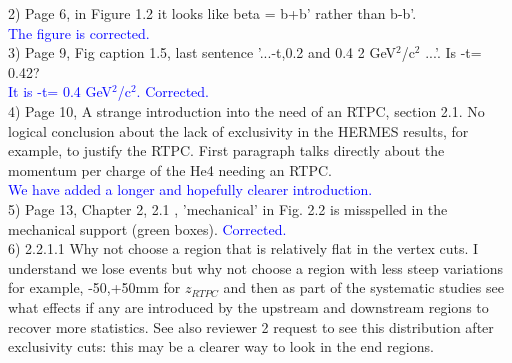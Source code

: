 2) Page 6, in Figure 1.2 it looks like beta = b+b' rather than b-b'. \\
\textcolor{blue}{ The figure is corrected.}\\

3) Page 9, Fig caption 1.5, last sentence  '...-t,0.2 and 0.4  2 
GeV$^{2}$/c$^{2}$ ...'.  Is -t= 0.42? \\
\textcolor{blue}{ It is -t= 0.4 GeV$^{2}$/c$^{2}$. Corrected.}\\

4) Page 10, A strange introduction into the need of an RTPC, section 2.1. No 
logical conclusion about the lack of exclusivity in the HERMES results, for 
example, to justify the RTPC. First paragraph talks directly about the momentum 
per charge of the He4 needing an RTPC.\\
\textcolor{blue}{We have added a longer and hopefully clearer introduction.}\\

5) Page 13, Chapter 2,  2.1 ,  'mechanical'  in Fig. 2.2 is misspelled in the mechanical support (green boxes).
\textcolor{blue}{ Corrected.}\\

6) 2.2.1.1 Why not choose a region that is relatively flat in the vertex cuts. I 
understand we lose events but why not choose a region with less steep 
variations for example, -50,+50mm for $z_{RTPC}$ and then as part of the 
systematic studies see what effects if any are introduced by the upstream and 
downstream regions to recover more statistics. See also reviewer 2 request to 
see this distribution after exclusivity cuts: this may be a clearer way to look 
in the end regions. \\

